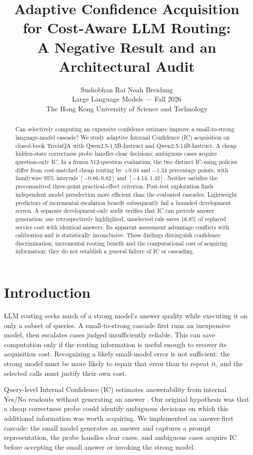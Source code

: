 \documentclass[11pt]{article}
\title{Adaptive Confidence Acquisition for Cost-Aware LLM Routing:\\
A Negative Result and an Architectural Audit}
\author{Sushobhan Rai \quad Noah Breidung \\
  Large Language Models --- Fall 2026 \\
  The Hong Kong University of Science and Technology}
\date{}
\begin{document}
\maketitle

\begin{abstract}
Can selectively computing an expensive confidence estimate improve a small-to-strong language-model cascade? We study adaptive Internal Confidence (IC) acquisition on closed-book TriviaQA with Qwen2.5-1.5B-Instruct and Qwen2.5-14B-Instruct. A cheap hidden-state correctness probe handles clear decisions; ambiguous cases acquire question-only IC. In a frozen 512-question evaluation, the two distinct IC-using policies differ from cost-matched cheap routing by $+0.04$ and $-1.34$ percentage points, with familywise 95\% intervals $[-0.86,0.82]$ and $[-4.14,1.42]$. Neither satisfies the precommitted three-point practical-effect criterion. Post-test exploration finds independent model preselection more efficient than the evaluated cascades. Lightweight predictors of incremental escalation benefit subsequently fail a bounded development screen. A separate development-only audit verifies that IC can precede answer generation: one retrospectively highlighted, unselected rule saves 16.8\% of replayed service cost with identical answers. Its apparent assessment advantage conflicts with calibration and is statistically inconclusive. These findings distinguish confidence discrimination, incremental routing benefit and the computational cost of acquiring information; they do not establish a general failure of IC or cascading.
\end{abstract}

\section{Introduction}
LLM routing seeks much of a strong model's answer quality while executing it on only a subset of queries. A small-to-strong cascade first runs an inexpensive model, then escalates cases judged insufficiently reliable. This can save computation only if the routing information is useful enough to recover its acquisition cost. Recognizing a likely small-model error is not sufficient: the strong model must be more likely to repair that error than to repeat it, and the selected calls must justify their own cost.

Query-level Internal Confidence (IC) estimates answerability from internal Yes/No readouts without generating an answer \citep{chen2026query}. Our original hypothesis was that a cheap correctness probe could identify ambiguous decisions on which this additional information was worth acquiring. We implemented an answer-first cascade: the small model generates an answer and captures a prompt representation, the probe handles clear cases, and ambiguous cases acquire IC before accepting the small answer or invoking the strong model.
\end{document}
